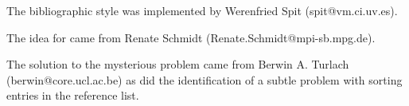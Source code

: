 The  bibliographic style was implemented by Werenfried Spit
(spit@vm.ci.uv.es).

The idea for  came from Renate Schmidt
(Renate.Schmidt@mpi-sb.mpg.de).

The solution to the mysterious  problem came
from Berwin A. Turlach (berwin@core.ucl.ac.be) as did the identification
of a subtle problem with sorting entries in the reference list.


